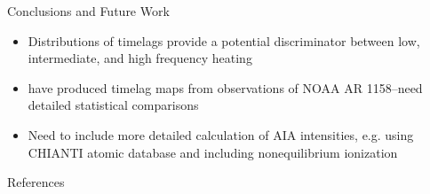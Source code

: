 \documentclass[final]{beamer}
\begin{document}
\begin{frame}
\begin{columns}[T]
\begin{column}{0.49\linewidth}
\begin{block}{Conclusions and Future Work}
\begin{itemize}
        \item Distributions of timelags provide a potential discriminator between low, intermediate, and high frequency heating
        \item \citet{viall_survey_2017} have produced timelag maps from observations of NOAA AR 1158--need detailed statistical comparisons
        \item Need to include more detailed calculation of AIA intensities, e.g. using CHIANTI atomic database \citep{dere_chianti_1997,young_chianti_2016} and including nonequilibrium ionization
      \end{itemize}
    \end{block}
    \begin{block}{References}
      \scriptsize
      \begin{multicols}{2}
        
        
      \end{multicols}
    \end{block}
  \end{column}
  \end{columns}
\end{frame}
\end{document}
